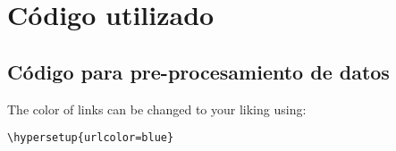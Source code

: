 
\chapter{Código utilizado} %

\label{AppendixA} %

\section{Código para pre-procesamiento de datos}

The color of links can be changed to your liking using:

{\small\verb!\hypersetup{urlcolor=blue}!}
